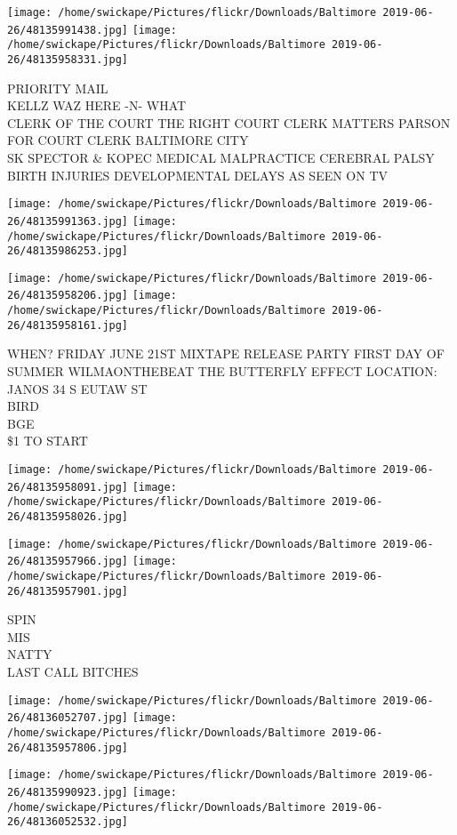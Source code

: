 \documentclass[10pt,letterpaper]{article}
\begin{document}
\texttt{[image: /home/swickape/Pictures/flickr/Downloads/Baltimore 2019-06-26/48135991438.jpg]}
\texttt{[image: /home/swickape/Pictures/flickr/Downloads/Baltimore 2019-06-26/48135958331.jpg]}

PRIORITY MAIL\\
KELLZ WAZ HERE {-}N{-} WHAT\\
CLERK OF THE COURT THE RIGHT COURT CLERK MATTERS PARSON FOR COURT CLERK BALTIMORE CITY\\
SK SPECTOR \& KOPEC MEDICAL MALPRACTICE CEREBRAL PALSY BIRTH INJURIES DEVELOPMENTAL DELAYS AS SEEN ON TV
\pagebreak

\texttt{[image: /home/swickape/Pictures/flickr/Downloads/Baltimore 2019-06-26/48135991363.jpg]}
\texttt{[image: /home/swickape/Pictures/flickr/Downloads/Baltimore 2019-06-26/48135986253.jpg]}

\texttt{[image: /home/swickape/Pictures/flickr/Downloads/Baltimore 2019-06-26/48135958206.jpg]}
\texttt{[image: /home/swickape/Pictures/flickr/Downloads/Baltimore 2019-06-26/48135958161.jpg]}

WHEN?  FRIDAY JUNE 21ST MIXTAPE RELEASE PARTY FIRST DAY OF SUMMER WILMAONTHEBEAT THE BUTTERFLY EFFECT LOCATION: JANOS 34 S EUTAW ST\\
BIRD\\
BGE\\
\$1 TO START
\pagebreak

\texttt{[image: /home/swickape/Pictures/flickr/Downloads/Baltimore 2019-06-26/48135958091.jpg]}
\texttt{[image: /home/swickape/Pictures/flickr/Downloads/Baltimore 2019-06-26/48135958026.jpg]}

\texttt{[image: /home/swickape/Pictures/flickr/Downloads/Baltimore 2019-06-26/48135957966.jpg]}
\texttt{[image: /home/swickape/Pictures/flickr/Downloads/Baltimore 2019-06-26/48135957901.jpg]}

SPIN\\
MIS\\
NATTY\\
LAST CALL BITCHES
\pagebreak

\texttt{[image: /home/swickape/Pictures/flickr/Downloads/Baltimore 2019-06-26/48136052707.jpg]}
\texttt{[image: /home/swickape/Pictures/flickr/Downloads/Baltimore 2019-06-26/48135957806.jpg]}

\texttt{[image: /home/swickape/Pictures/flickr/Downloads/Baltimore 2019-06-26/48135990923.jpg]}
\texttt{[image: /home/swickape/Pictures/flickr/Downloads/Baltimore 2019-06-26/48136052532.jpg]}
\end{document}
